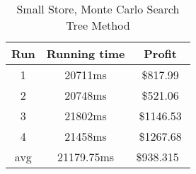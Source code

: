 \documentclass[12pt]{article}
\begin{document}
    \begin{table}
        \centering
        \begin{tabular}{ |c|c|c| }
            \hline
            Run & Running time & Profit \\
            \hline
            1 & 20711ms & \$817.99\\
            2 & 20748ms & \$521.06\\
            3 & 21802ms & \$1146.53\\
            4 & 21458ms & \$1267.68\\
            avg & 21179.75ms & \$938.315\
            \hline
        \end{tabular}

        \caption{Small Store, Monte Carlo Search Tree Method}
    \end{table}
\end{document}
